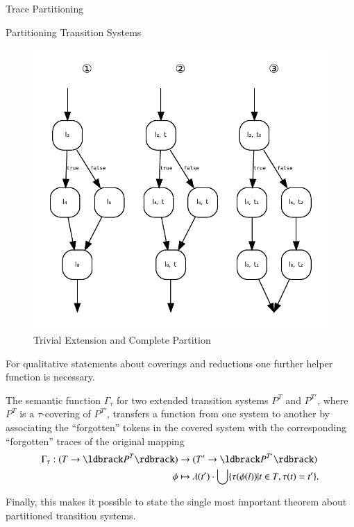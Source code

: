 \begin{chapter}{Trace Partitioning}
\begin{section}{Partitioning Transition Systems}
\begin{example}
			\begin{figure}[t]
				\centering
				\includegraphics{Graphs/Examples_ifExampleExtendedTransitionSystem.pdf}
				\caption{Trivial Extension and Complete Partition}
				\label{figure:positiveextendedtransitionsystem}
			\end{figure}
		\end{example}

		For qualitative statements about coverings and reductions one further helper function is necessary.

		\begin{definition}
			\label{definition:SemanticTransfer}
			The semantic function $\Gamma_\tau$ for two extended transition systems $P^T$ and $P^{T'}$, where $P^T$ is a $\tau$-covering of $P^{T'}$, transfers a function from one system to another by associating the ``forgotten'' tokens in the covered system with the corresponding ``forgotten'' traces of the original mapping
			\begin{align}
				\Gamma_\tau: (T \to \concrete{P^T}) &\to (T' \to \concrete{P^{T'}})\\
				\phi &\mapsto \lambda(t') \cdot \bigcup\{ \tau(\phi(l)) | t \in T, \tau(t) = t' \}. \notag
			\end{align}
		\end{definition}

		Finally, this makes it possible to state the single most important theorem about partitioned transition systems.
		

\end{section}
\end{chapter}
